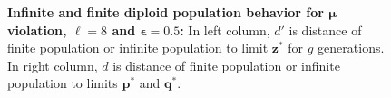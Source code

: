 \begin{figure}[!b]
\begin{center}
\hspace{-3em}%
\vspace{-0.5em}  \hspace{-3em}%


\caption[\textbf{Infinite and finite diploid population behavior for $\bm{\mu}$ violation, $\ell = 8$ and $\bm{\epsilon} = 0.5$}]
{\textbf{Infinite and finite diploid population behavior for $\bm{\mu}$ violation, $\ell = 8$ and $\bm{\epsilon} = 0.5$:} 
  In left column, $d'$ is distance of finite population or infinite population to limit $\bm{z}^\ast$ for $g$ generations. 
  In right column, $d$ is distance of finite population or infinite population to limits $\bm{p}^\ast$ and $\bm{q}^\ast$.}
\label{oscillation_8d_vio_mu_0.5}
\end{center}
\end{figure}

